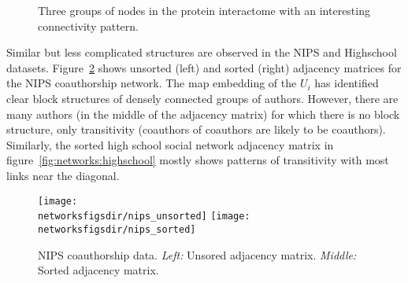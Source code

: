 \begin{figure}[ht]
  \centering
{}
  \caption{Three groups of nodes in the protein interactome with an interesting connectivity pattern.}
  \label{fig:networks:butterfly}
\end{figure}

Similar but less complicated structures are observed in the NIPS and Highschool datasets.
Figure~\ref{fig:networks:nips} shows unsorted (left) and sorted (right) adjacency matrices for the NIPS coauthorship network.
The map embedding of the $U_i$ has identified clear block structures of densely connected groups of authors.
However, there are many authors (in the middle of the adjacency matrix) for which there is no block structure, only transitivity (coauthors of coauthors are likely to be coauthors).
Similarly, the sorted high school social network adjacency matrix in figure~\ref{fig:networks:highschool} mostly shows patterns of transitivity with most links near the diagonal.

\begin{figure}[ht]
  \centering
  \texttt{[image: \\networksfigsdir/nips\_unsorted]}
  \texttt{[image: \\networksfigsdir/nips\_sorted]}
  \caption[Unsorted and sorted NIPS coauthorship adjacency matrices.]{NIPS coauthorship data. 
    \emph{Left:} Unsored adjacency matrix. 
    \emph{Middle:} Sorted adjacency matrix.
  }
  \label{fig:networks:nips}
\end{figure}

